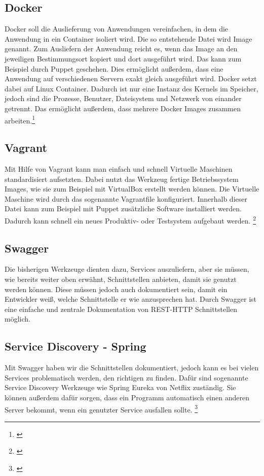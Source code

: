 \subsection{Docker}
\label{subsec:docker}
Docker soll die Auslieferung von Anwendungen vereinfachen, in dem die Anwendung in ein Container isoliert wird. Die so entstehende Datei wird Image genannt. Zum Ausliefern der Anwendung reicht es, wenn das Image an den jeweiligen Bestimmungsort kopiert und dort ausgeführt wird. Das kann zum Beispiel durch Puppet geschehen. Dies ermöglicht außerdem, dass eine Anwendung auf verschiedenen Servern exakt gleich ausgeführt wird.
Docker setzt dabei auf Linux Container. Dadurch ist nur eine Instanz des Kernels im Speicher, jedoch sind die Prozesse, Benutzer, Dateisystem und Netzwerk von einander getrennt. Das ermöglicht außerdem, dass mehrere Docker Images zusammen arbeiten.\footnote{\cite[vgl. S. 53 ff.]{EWolff2015:ContinuouosDelivery}}

\subsection{Vagrant}
\label{subesec:vagrant}
Mit Hilfe von Vagrant kann man einfach und schnell Virtuelle Maschinen standardisiert aufsetzten. Dabei nutzt das Werkzeug fertige Betriebssystem Images, wie sie zum Beispiel mit VirtualBox erstellt werden können. Die Virtuelle Maschine wird durch das sogenannte Vagrantfile konfiguriert. Innerhalb dieser Datei kann zum Beispiel mit Puppet zusätzliche Software installiert werden. Dadurch kann schnell ein neues Produktiv- oder Testsystem aufgebaut werden.
\footnote{\cite[vgl. S. 49 ff.]{EWolff2015:ContinuouosDelivery}}

\subsection{Swagger}
\label{subsec:swagger}
Die bisherigen Werkzeuge dienten dazu, Services auszuliefern, aber sie müssen, wie bereits weiter oben erwähnt, Schnittstellen anbieten, damit sie genutzt werden können. Diese müssen jedoch auch dokumentiert sein, damit ein Entwickler weiß, welche Schnittstelle er wie anzusprechen hat. Durch Swagger ist eine einfache und zentrale Dokumentation von REST-HTTP Schnittstellen möglich.

\subsection{Service Discovery - Spring}
\label{subsec:ServiceDiscovery}
Mit Swagger haben wir die Schnittstellen dokumentiert, jedoch kann es bei vielen Services problematisch werden, den richtigen zu finden. Dafür sind sogenannte Service Discovery Werkzeuge wie Spring Eureka von Netflix zuständig. Sie können außerdem dafür sorgen, dass ein Programm automatisch einen anderen Server bekommt, wenn ein genutzter Service ausfallen sollte. \footnote{\cite[vgl. S. 326 ff.]{EWolff2016:Microservices}}

